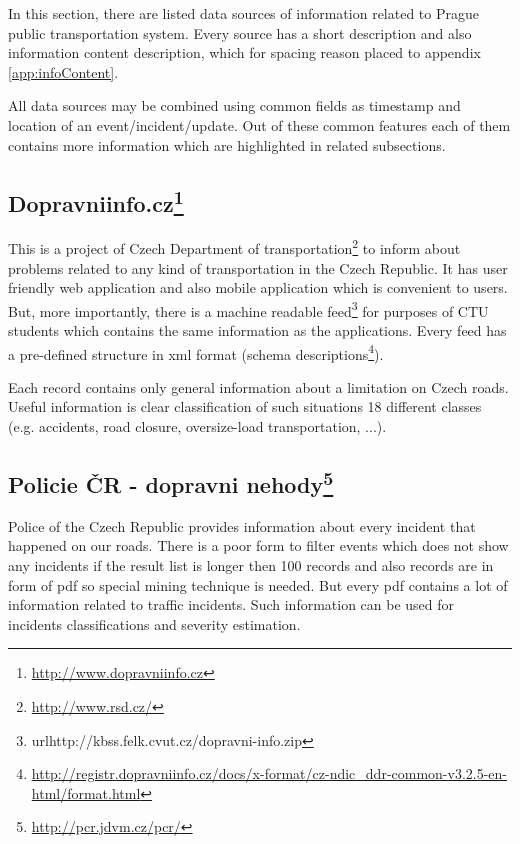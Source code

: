 \documentclass{article}
\begin{document}
In this section, there are listed data sources of information related to Prague public transportation system. Every source has a short description and also information content description, which for spacing reason placed to appendix \ref{app:infoContent}.

All data sources may be combined using common fields as timestamp and location of an event/incident/update. Out of these common features each of them contains more information which are highlighted in related subsections. 

\subsection{\label{sec:dataSources-dopInf}Dopravniinfo.cz\footnote{\url{http://www.dopravniinfo.cz}}}
This is a project of Czech Department of transportation\footnote{\url{http://www.rsd.cz/}} to inform about problems related to any kind of transportation in the Czech Republic. It has user friendly web application and also mobile application which is convenient to users. But, more importantly, there is a machine readable feed\footnote{url{http://kbss.felk.cvut.cz/dopravni-info.zip}} for purposes of CTU students which contains the same information as the applications. Every feed has a pre-defined structure in xml format (schema descriptions\footnote{\url{http://registr.dopravniinfo.cz/docs/x-format/cz-ndic_ddr-common-v3.2.5-en-html/format.html}}).

Each record contains only general information about a limitation on Czech roads. Useful information is clear classification of such situations 18 different classes (e.g. accidents, road closure, oversize-load transportation, ...). 


\subsection{\label{sec:dataSources-pcrDN}Policie ČR - dopravni nehody\footnote{\url{http://pcr.jdvm.cz/pcr/}}}

Police of the Czech Republic provides information about every incident that happened on our roads. There is a poor form to filter events which does not show any incidents if the result list is longer then 100 records and also records are in form of pdf so special mining technique is needed. But every pdf contains a lot of information related to traffic incidents. Such information can be used for incidents classifications and severity estimation.
\end{document}
